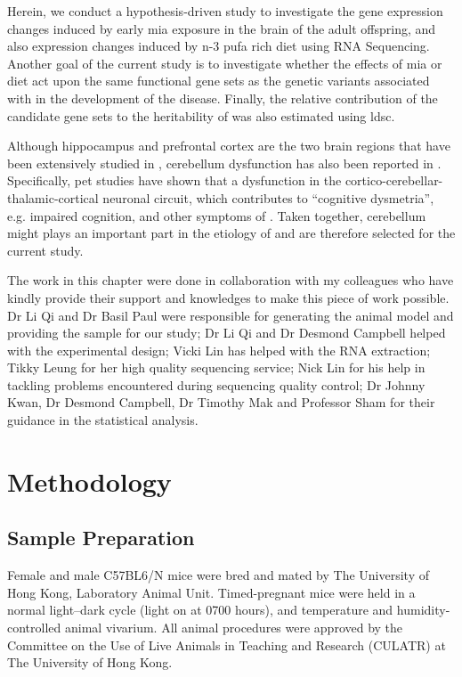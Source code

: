 Herein, we conduct a hypothesis-driven study to investigate the gene expression changes induced by early \gls{mia} exposure in the brain of the adult offspring, and also expression changes induced by n-3 \gls{pufa} rich diet using RNA Sequencing.
Another goal of the current study is to investigate whether the effects of \gls{mia} or diet act upon the same functional gene sets as the genetic variants associated with  in the development of the disease.
Finally, the relative contribution of the candidate gene sets to the heritability of  was also estimated using \gls{ldsc}.

Although hippocampus \citep{Velakoulis2006,Nugent2007} and prefrontal cortex \citep{Knable1997,Perlstein2001} are the two brain regions that have been extensively studied in , cerebellum dysfunction has also been reported in  \citep{Yeganeh-Doost2011,Andreasen2008}.
Specifically, \gls{pet} studies have shown that a dysfunction in the cortico-cerebellar-thalamic-cortical neuronal circuit, which contributes to ``cognitive dysmetria'', e.g. impaired cognition, and other symptoms of  \citep{Yeganeh-Doost2011}.
Taken together, cerebellum might plays an important part in the etiology of  and are therefore selected for the current study. 

The work in this chapter were done in collaboration with my colleagues who have kindly provide their support and knowledges to make this piece of work possible.
Dr Li Qi and Dr Basil Paul were responsible for generating the animal model and providing the sample for our study;
Dr Li Qi and Dr Desmond Campbell helped with the experimental design;
Vicki Lin has helped with the RNA extraction; 
Tikky Leung for her high quality sequencing service;
Nick Lin for his help in tackling problems encountered during sequencing quality control; 
Dr Johnny Kwan, Dr Desmond Campbell, Dr Timothy Mak and Professor Sham for their guidance in the statistical analysis.

\section{Methodology}
\subsection{Sample Preparation}
Female and male C57BL6/N mice were bred and mated by The University of Hong Kong, Laboratory Animal Unit. 
Timed-pregnant mice were held in a normal light–dark cycle (light on at 0700 hours), and temperature and humidity-controlled animal vivarium. 
All animal procedures were approved by the Committee on the Use of Live Animals in Teaching and Research (CULATR) at The University of Hong Kong.

